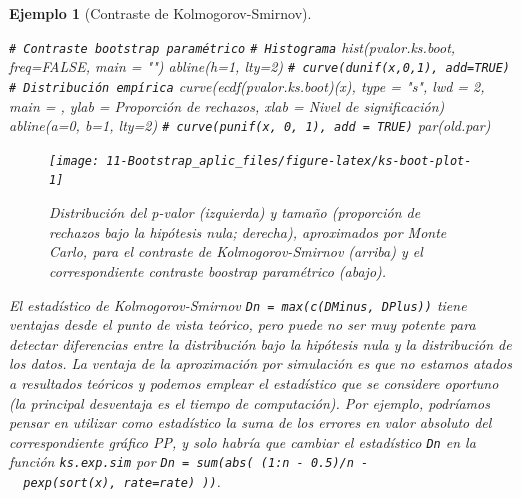 \documentclass[
]{book}
\newenvironment{Shaded}{\begin{snugshade}}{\end{snugshade}}
\newcommand{\AttributeTok}[1]{\textcolor[rgb]{0.77,0.63,0.00}{#1}}
\newcommand{\CommentTok}[1]{\textcolor[rgb]{0.56,0.35,0.01}{\textit{#1}}}
\newcommand{\ConstantTok}[1]{\textcolor[rgb]{0.00,0.00,0.00}{#1}}
\newcommand{\DecValTok}[1]{\textcolor[rgb]{0.00,0.00,0.81}{#1}}
\newcommand{\FunctionTok}[1]{\textcolor[rgb]{0.00,0.00,0.00}{#1}}
\newcommand{\NormalTok}[1]{#1}
\newcommand{\StringTok}[1]{\textcolor[rgb]{0.31,0.60,0.02}{#1}}
\theoremstyle{break}
\newtheorem{example}{Ejemplo}[chapter]
\theoremstyle{nonumberplain}
\renewcommand{\CommentTok}[1]{\textcolor[rgb]{0.41,0.41,0.41}{\texttt{#1}}}
\begin{document}
\begin{example}[Contraste de Kolmogorov-Smirnov]
\begin{Shaded}
\begin{Highlighting}[]
\CommentTok{\# Contraste bootstrap paramétrico}
  \CommentTok{\# Histograma}
\FunctionTok{hist}\NormalTok{(pvalor.ks.boot, }\AttributeTok{freq=}\ConstantTok{FALSE}\NormalTok{, }\AttributeTok{main =} \StringTok{""}\NormalTok{)}
\FunctionTok{abline}\NormalTok{(}\AttributeTok{h=}\DecValTok{1}\NormalTok{, }\AttributeTok{lty=}\DecValTok{2}\NormalTok{)   }\CommentTok{\# curve(dunif(x,0,1), add=TRUE)}
  \CommentTok{\# Distribución empírica}
\FunctionTok{curve}\NormalTok{(}\FunctionTok{ecdf}\NormalTok{(pvalor.ks.boot)(x), }\AttributeTok{type =} \StringTok{"s"}\NormalTok{, }\AttributeTok{lwd =} \DecValTok{2}\NormalTok{, }\AttributeTok{main =} \StringTok{\textquotesingle{}\textquotesingle{}}\NormalTok{, }
      \AttributeTok{ylab =} \StringTok{\textquotesingle{}Proporción de rechazos\textquotesingle{}}\NormalTok{,  }\AttributeTok{xlab =} \StringTok{\textquotesingle{}Nivel de significación\textquotesingle{}}\NormalTok{)}
\FunctionTok{abline}\NormalTok{(}\AttributeTok{a=}\DecValTok{0}\NormalTok{, }\AttributeTok{b=}\DecValTok{1}\NormalTok{, }\AttributeTok{lty=}\DecValTok{2}\NormalTok{)   }\CommentTok{\# curve(punif(x, 0, 1), add = TRUE)}
\FunctionTok{par}\NormalTok{(old.par)}
\end{Highlighting}
\end{Shaded}

\begin{figure}[!htb]

{\centering \texttt{[image: 11-Bootstrap\_aplic\_files/figure-latex/ks-boot-plot-1]} 

}

\caption{Distribución del p-valor (izquierda) y tamaño (proporción de rechazos bajo la hipótesis nula; derecha), aproximados por  Monte Carlo, para el contraste de Kolmogorov-Smirnov (arriba) y el correspondiente contraste boostrap paramétrico (abajo).}\label{fig:ks-boot-plot}
\end{figure}

El estadístico de Kolmogorov-Smirnov \texttt{Dn\ =\ max(c(DMinus,\ DPlus))} tiene ventajas desde el
punto de vista teórico, pero puede no ser muy potente para detectar diferencias entre la
distribución bajo la hipótesis nula y la distribución de los datos.
La ventaja de la aproximación por simulación es que no estamos atados a resultados teóricos
y podemos emplear el estadístico que se considere oportuno
(la principal desventaja es el tiempo de computación).
Por ejemplo, podríamos pensar en utilizar como estadístico la suma de los errores en
valor absoluto del correspondiente gráfico PP, y solo habría que cambiar el estadístico
\texttt{Dn} en la función \texttt{ks.exp.sim} por \texttt{Dn\ =\ sum(abs(\ (1:n\ -\ 0.5)/n\ -\ \ pexp(sort(x),\ rate=rate)\ ))}.
\end{example}
\end{document}
